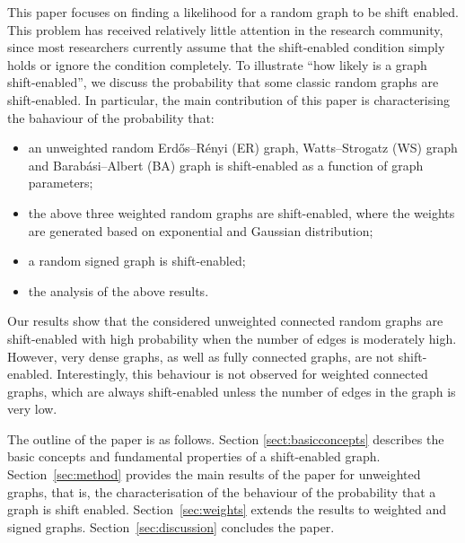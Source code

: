 \documentclass[journal]{IEEEtran}
\begin{document}
This paper focuses on finding a likelihood for a random graph to be shift enabled. %
This problem has received relatively little attention in the research community, since most researchers currently assume that the shift-enabled
condition simply holds or ignore the condition completely.
To illustrate ``how likely is a graph shift-enabled'',
we discuss the probability that some classic random graphs are shift-enabled. 
In particular, the main contribution of this paper is characterising the bahaviour of the probability that:
\begin{itemize}
	\item an unweighted random Erdős–Rényi (ER) graph, Watts–Strogatz (WS) graph and Barabási–Albert (BA) graph is shift-enabled as a function of graph parameters;
	\item the above three weighted random graphs are shift-enabled, where the weights are generated based on exponential and Gaussian distribution;
	\item a random signed graph is shift-enabled; 
	\item the analysis of the above results.
\end{itemize}
Our results show that the considered unweighted connected random graphs are shift-enabled with high probability when the number of edges is moderately high. However, very dense graphs, as well as fully connected graphs, are not shift-enabled. Interestingly, this behaviour is not observed for weighted connected graphs, which are always shift-enabled unless the number of edges in the graph is very low.

The outline of the paper is as follows. Section
\ref{sect:basicconcepts} describes the basic concepts and fundamental properties of a shift-enabled graph. Section~\ref{sec:method} provides the main results of the paper for unweighted graphs, that is, the characterisation of the behaviour of the probability that a graph is shift enabled. Section~\ref{sec:weights} extends the results to weighted and signed graphs.
Section~\ref{sec:discussion} concludes the paper.
\end{document}
